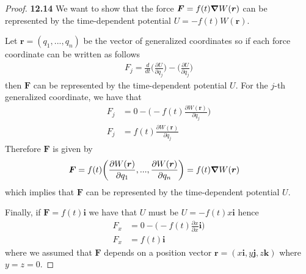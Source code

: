 \documentclass[11pt]{article}
\theoremstyle{definition}
\begin{document}
\begin{proof}{\textbf{12.14}}
    We want to show that the force $\bm{F} = f(t)\grad{W(\bm{r})}$ can be
    represented by the time-dependent potential $U = -f(t)W(\bm{r})$.
    
    Let $\bm{r} = (q_1, ..., q_n)$ be the vector of generalized coordinates
    so if each force coordinate can be written as follows
    \begin{align*}
        F_j = \frac{d}{dt}\bigg(\frac{\partial U}{\partial \dot{q_j}}\bigg)
        - \bigg(\frac{\partial U}{\partial q_j}\bigg)
    \end{align*}
    then $\bm{F}$ can be represented by the time-dependent potential $U$.
    For the $j$-th generalized coordinate, we have that
    \begin{align*}
        F_j &= 0 - \bigg(-f(t)\frac{\partial W(\bm{r})}{\partial q_j}\bigg)\\
        F_j &= f(t)\frac{\partial W(\bm{r})}{\partial q_j}
    \end{align*}
    Therefore $\bm{F}$ is given by
    \begin{align*}
        \bm{F} &= f(t)\bigg(\frac{\partial W(\bm{r})}{\partial q_1}, ...,
        \frac{\partial W(\bm{r})}{\partial q_n}\bigg) = f(t)\grad{W(\bm{r})}
    \end{align*}
    which implies that $\bm{F}$ can be represented by the time-dependent
    potential $U$.

    Finally, if $\bm{F} = f(t)\bm{i}$ we have that $U$ must be
    $U = -f(t)x\bm{i}$ hence
    \begin{align*}
        F_x &= 0 - \bigg(-f(t)\frac{\partial x}{\partial x}\bm{i}\bigg)\\
        F_x &= f(t)\bm{i}
    \end{align*}
    where we assumed that $\bm{F}$ depends on a position vector
    $\bm{r} = (x\bm{i}, y\bm{j}, z\bm{k})$ where $y=z=0$.
\end{proof}
\cleardoublepage
\end{document}

